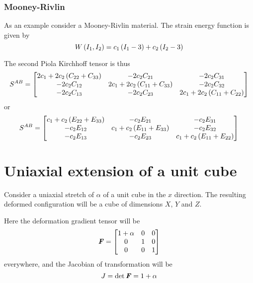 \subsubsection{Mooney-Rivlin}

As an example consider a Mooney-Rivlin material. The strain energy function is
given by
\begin{equation}
   W\left( I_{1},I_{2} \right) =c_{1}\left( I_{1}-3 \right)+c_{2}\left( I_{2}-3 \right)
\end{equation}

The second Piola Kirchhoff tensor is thus
\begin{equation}
  S^{AB}=\begin{bmatrix}
    2c_{1}+2c_{2}\left( C_{22}+C_{33} \right) & -2c_{2}C_{21} & -2c_{2}C_{31} \\
    -2c_{2}C_{12} & 2c_{1}+2c_{2}\left( C_{11}+C_{33} \right) & -2c_{2}C_{32} \\
    -2c_{2}C_{13} & -2c_{2}C_{23} & 2c_{1}+2c_{2}\left( C_{11}+C_{22} \right)
  \end{bmatrix}
\end{equation}
or
\begin{equation}
  S^{AB}=\begin{bmatrix}
    c_{1}+c_{2}\left( E_{22}+E_{33} \right) & -c_{2}E_{21} & -c_{2}E_{31} \\
    -c_{2}E_{12} & c_{1}+c_{2}\left( E_{11}+E_{33} \right) & -c_{2}E_{32} \\
    -c_{2}E_{13} & -c_{2}E_{23} & c_{1}+c_{2}\left( E_{11}+E_{22} \right)
  \end{bmatrix}
\end{equation}

\section{Uniaxial extension of a unit cube}

Consider a uniaxial stretch of $\alpha$ of a unit cube in the $x$
direction. The resulting deformed configuration will be a cube of dimensions
$X$, $Y$ and $Z$.

Here the deformation gradient tensor will be
\begin{equation}
  \boldsymbol{\mathit{F}}= \begin{bmatrix}
    1+\alpha & 0 & 0 \\
    0 & 1 & 0 \\
    0 & 0 & 1
  \end{bmatrix}
\end{equation}
everywhere, and the Jacobian of transformation will be 
\begin{equation}
  J = \det{\ensuremath{\boldsymbol{\mathit{F}}}}=1+\alpha
\end{equation}

